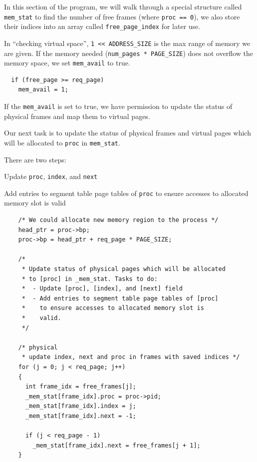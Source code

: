 \documentclass[a4paper]{article}
\numberwithin{equation}{section}
\begin{document}
In this section of the program, we will walk through a special structure called \texttt{mem_stat} to find the number of free frames (where \texttt{proc == 0}), we also store their indices into an array called \texttt{free_page_index} for later use.

In ``checking virtual space'', \texttt{1 << ADDRESS_SIZE} is the max range of memory we are given.
If the memory needed (\texttt{num_pages * PAGE_SIZE}) does not overflow the memory space, we set \texttt{mem_avail} to true.
\begin{mdframed}[leftline=false,rightline=false,backgroundcolor=magenta!10,nobreak=false]
  \begin{verbatim}
  if (free_page >= req_page)
    mem_avail = 1;
    \end{verbatim}
\end{mdframed}

If the \texttt{mem_avail} is set to true, we have permission to update the status of physical frames and map them to virtual pages.

Our next task is to update the status of physical frames and virtual pages which will be allocated to \texttt{proc} in \texttt{mem_stat}.

There are two steps:
\begin{steps}
  \item Update \texttt{proc}, \texttt{index}, and \texttt{next}
  \item Add entries to segment table page tables of \texttt{proc} to ensure accesses to allocated memory slot is valid
\end{steps}
\begin{mdframed}[leftline=false,rightline=false,backgroundcolor=magenta!10,nobreak=false]
  \begin{verbatim}
    /* We could allocate new memory region to the process */
    head_ptr = proc->bp;
    proc->bp = head_ptr + req_page * PAGE_SIZE;

    /*
     * Update status of physical pages which will be allocated
     * to [proc] in _mem_stat. Tasks to do:
     * 	- Update [proc], [index], and [next] field
     * 	- Add entries to segment table page tables of [proc]
     * 	  to ensure accesses to allocated memory slot is
     * 	  valid.
     */

    /* physical
     * update index, next and proc in frames with saved indices */
    for (j = 0; j < req_page; j++)
    {
      int frame_idx = free_frames[j];
      _mem_stat[frame_idx].proc = proc->pid;
      _mem_stat[frame_idx].index = j;
      _mem_stat[frame_idx].next = -1;

      if (j < req_page - 1)
        _mem_stat[frame_idx].next = free_frames[j + 1];
    }
  \end{verbatim}
\end{mdframed}
\end{document}
